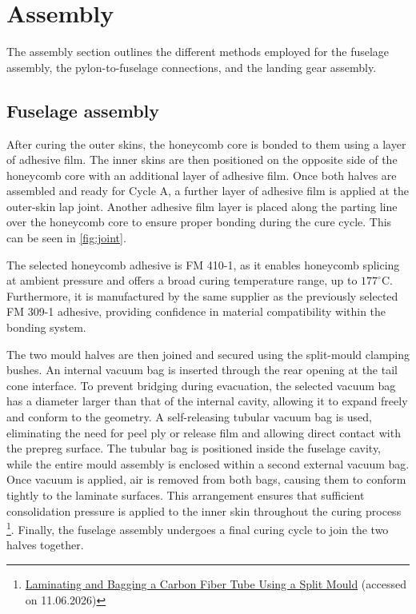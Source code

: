 \section{Assembly}
\label{sec:assembly}

The assembly section outlines the different methods employed for the fuselage assembly, the pylon-to-fuselage connections, and the landing gear assembly.

\subsection{Fuselage assembly}
\label{sub:fuselage_assembly}

After curing the outer skins, the honeycomb core is bonded to them using a layer of adhesive film. The inner skins are then positioned on the opposite side of the honeycomb core with an additional layer of adhesive film. Once both halves are assembled and ready for Cycle A, a further layer of adhesive film is applied at the outer-skin lap joint. Another adhesive film layer is placed along the parting line over the honeycomb core to ensure proper bonding during the cure cycle. This can be seen in \autoref{fig:joint}.

The selected honeycomb adhesive is FM 410-1, as it enables honeycomb splicing at ambient pressure and offers a broad curing temperature range, up to $177^{\circ}$C. Furthermore, it is manufactured by the same supplier as the previously selected FM 309-1 adhesive, providing confidence in material compatibility within the bonding system.

The two mould halves are then joined and secured using the split-mould clamping bushes. An internal vacuum bag is inserted through the rear opening at the tail cone interface. To prevent bridging during evacuation, the selected vacuum bag has a diameter larger than that of the internal cavity, allowing it to expand freely and conform to the geometry. A self-releasing tubular vacuum bag is used, eliminating the need for peel ply or release film and allowing direct contact with the prepreg surface. The tubular bag is positioned inside the fuselage cavity, while the entire mould assembly is enclosed within a second external vacuum bag. Once vacuum is applied, air is removed from both bags, causing them to conform tightly to the laminate surfaces. This arrangement ensures that sufficient consolidation pressure is applied to the inner skin throughout the curing process \footnote{\href{https://www.easycomposites.eu/learning/split-mould-carbon-fibre-tube}{Laminating and Bagging a Carbon Fiber Tube Using a Split Mould} (accessed on 11.06.2026)}. Finally, the fuselage assembly undergoes a final curing cycle to join the two halves together.

